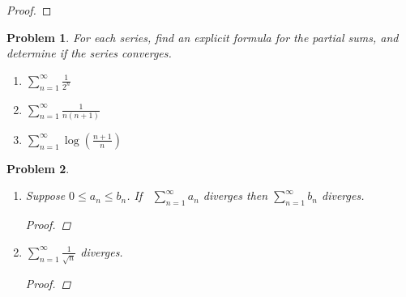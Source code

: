 \documentclass[12pt]{article}
\newtheorem{problem}{Problem}
\begin{document}

\begin{proof}
\end{proof}


\begin{problem} %
For each series, find an explicit formula for the partial sums, and determine if the series converges.

\renewcommand{\labelenumi}{(\alph{enumi})}
\begin{enumerate}
\item $\displaystyle \sum_{n=1}^\infty \frac{1}{2^n}$


\item $\displaystyle \sum_{n=1}^\infty \frac{1}{n(n+1)}$


\item $\displaystyle \sum_{n=1}^\infty \log\left(\frac{n+1}{n}\right)$  %


\end{enumerate}
\end{problem}


\begin{problem} %
\phantom{foo}


\renewcommand{\labelenumi}{(\alph{enumi})}
\begin{enumerate}
\item Suppose $0 \le a_n \le b_n$.  If \, $\displaystyle \sum_{n=1}^\infty a_n$ diverges then $\displaystyle \sum_{n=1}^\infty b_n$ diverges.

\begin{proof}
\end{proof}

\item $\displaystyle \sum_{n=1}^\infty \frac{1}{\sqrt{n}}$ diverges.

\begin{proof}
\end{proof}

\end{enumerate}
\end{problem}
\end{document}
